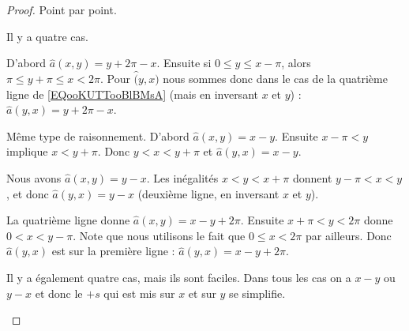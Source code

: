 \begin{proof}
	Point par point.
	\begin{subproof}
		Il y a quatre cas.
		\begin{subproof}
			D'abord \( \hat a(x,y)=y+2\pi-x\). Ensuite si \( 0\leq y\leq x-\pi\), alors \( \pi\leq y+\pi\leq x <2\pi\). Pour \( \hat(y,x)\) nous sommes donc dans le cas de la quatrième ligne de \eqref{EQooKUTTooBlBMsA} (mais en inversant \( x\) et \( y\)) : \( \hat a(y,x)=y+2\pi-x\).

			Même type de raisonnement. D'abord \( \hat a(x,y)=x-y\). Ensuite \( x-\pi<y\) implique \( x<y+\pi \). Donc \( y<x<y+\pi\) et \( \hat a(y,x)=x-y\).

			Nous avons \( \hat a(x,y)=y-x\). Les inégalités \( x<y<x+\pi\) donnent \( y-\pi<x<y\), et donc \( \hat a(y,x)=y-x\) (deuxième ligne, en inversant \( x\) et \( y\)).

			La quatrième ligne donne \( \hat a(x,y)=x-y+2\pi\). Ensuite \( x+\pi<y<2\pi\) donne \( 0<x<y-\pi\). Note que nous utilisons le fait que \( 0\leq x<2\pi\) par ailleurs. Donc \( \hat a(y,x)\) est sur la première ligne : \( \hat a(y,x)=x-y+2\pi\).
		\end{subproof}
		Il y a également quatre cas, mais ils sont faciles. Dans tous les cas on a \( x-y\) ou \( y-x\) et donc le \( +s\) qui est mis sur \( x\) et sur \( y\) se simplifie.


\end{subproof}
\end{proof}
